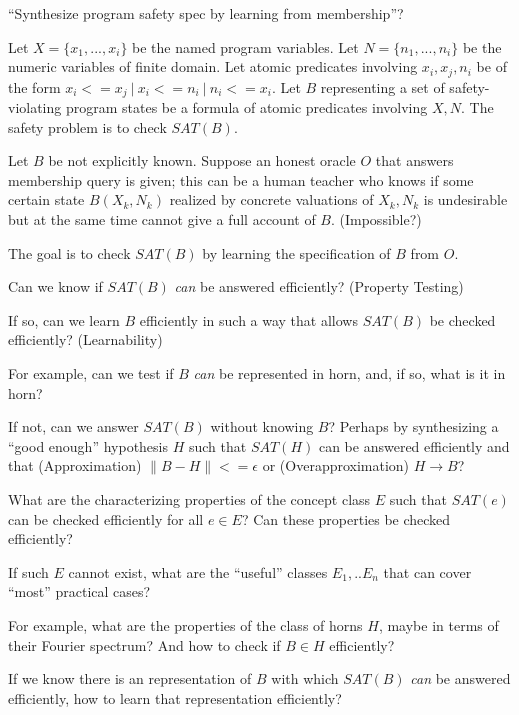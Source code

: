 \documentclass[12pt]{llncs}
\begin{document}

``Synthesize program safety spec by learning from membership''?

Let $X = \{x_1, ..., x_i\}$ be the named program variables.
Let $N = \{n_1, ..., n_i\}$ be the numeric variables
of finite domain.
Let atomic predicates involving $x_i,x_j,n_i$ be of
the form $x_i <= x_j\ |\ x_i <= n_i\ |\ n_i <= x_i$.
Let $B$ representing a set of safety-violating program states
be a formula of atomic predicates involving $X,N$.
The safety problem is to check $SAT(B)$.

Let $B$ be not explicitly known. Suppose an honest oracle $O$
that answers membership query is given; this can be a human
teacher who knows if some certain state $B(X_k,N_k)$ realized
by concrete valuations of $X_k,N_k$ is undesirable but
at the same time cannot give a full account of $B$. (Impossible?)

The goal is to check $SAT(B)$ by learning the specification of
$B$ from $O$.

\begin{thing}
Can we know if $SAT(B)$ \emph{can} be answered efficiently?
(Property Testing)

If so, can we learn $B$ efficiently in such a way that allows
$SAT(B)$ be checked efficiently?
(Learnability)

For example, can we test if $B$ \emph{can}
be represented in horn, and, if so, what is it in horn?

If not, can we answer $SAT(B)$ without knowing $B$? Perhaps
by synthesizing a ``good enough'' hypothesis $H$ such that
$SAT(H)$ can be answered efficiently and that
(Approximation) $\|B - H\| <= \epsilon$ or
(Overapproximation) $H \to B$?
\end{thing}

\begin{thing}
What are the characterizing properties of the concept
class $E$ such that $SAT(e)$ can be checked efficiently
for all $e \in E$? Can these properties be checked efficiently?

If such $E$ cannot exist, what are the ``useful'' classes
$E_1, .. E_n$ that can cover ``most'' practical cases?

For example, what are the properties of the class of horns $H$,
maybe in terms of their Fourier spectrum? And how to check if
$B \in H$ efficiently?
\end{thing}

\begin{thing}[Learnability]
If we know there is an representation of $B$ with which
$SAT(B)$ \emph{can} be answered efficiently, how to learn that
representation efficiently?

\end{thing}

\end{document}
